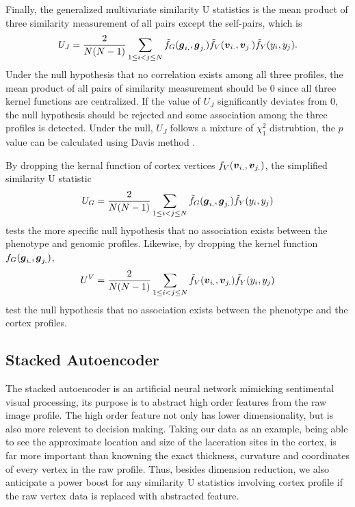 Finally, the generalized multivariate similarity U statistics is the mean product of three similarity measurement of all pairs except the self-pairs, which is
\[ U_J = \frac{2}{N(N-1)} \sum_{1 \leq i < j \leq N} \tilde{f}_G(\boldsymbol{g}_{i.}, \boldsymbol{g}_{j.}) \tilde{f}_V(\boldsymbol{v}_{i.}, \boldsymbol{v}_{j.}) \tilde{f}_Y(y_i, y_j). \]
Under the null hypothesis that no correlation exists among all three profiles, the mean product of all pairs of similarity measurement should be $0$ since all three kernel functions are centralized. If the value of $U_J$ significantly deviates from $0$, the null hypothesis should be rejected and some association among the three profiles is detected. Under the null, $U_J$ follows a mixture of $\chi_1^2$ distrubtion, the $p$ value can be calculated using Davis method \cite{HWU}.

By dropping the kernal function of cortex vertices $f_V(\boldsymbol{v}_{i.}, \boldsymbol{v}_{j.})$, the simplified similarity U statistic
\[ U_G = \frac{2}{N(N-1)} \sum_{1 \leq i < j \leq N} \tilde{f}_G(\boldsymbol{g}_{i.}, \boldsymbol{g}_{j.}) \tilde{f}_Y(y_i, y_j) \]
tests the more specific null hypothesis that no association exists between the phenotype and genomic profiles. Likewise, by dropping the kernel function $f_G(\boldsymbol{g}_{i.}, \boldsymbol{g}_{j.})$, 
\[ U^V = \frac{2}{N(N-1)} \sum_{1 \leq i < j \leq N} \tilde{f}_V(\boldsymbol{v}_{i.}, \boldsymbol{v}_{j.}) \tilde{f}_Y(y_i, y_j) \]
test the null hypothesis that no association exists between the phenotype and the cortex profiles.

\subsection{Stacked Autoencoder}
The stacked autoencoder is an artificial neural network mimicking sentimental visual processing, its purpose is to abstract high order features from the raw image profile. The high order feature not only has lower dimensionality, but is also more relevent to decision making. Taking our data as an example, being able to see the approximate location and size of the laceration sites in the cortex, is far more important than knowning the exact thickness, curvature and coordinates of every vertex in the raw profile. Thus, besides dimension reduction, we also anticipate a power boost for any similarity U statistics involving cortex profile if the raw vertex data is replaced with abstracted feature.

